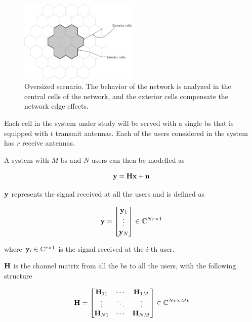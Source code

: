 \begin{figure}[t]
   \centering
   \includegraphics[width=0.5\textwidth]{./03.system_model/img/interfering_scenario}
   \caption{Oversized scenario. The behavior of the network is analyzed in the
            central cells of the network, and the exterior cells compensate the 
            network edge effects.}
   \label{fig:interfering_scenario}
\end{figure}

Each cell in the system under study will be served with a single \gls{bs} that
is equipped with $t$ transmit antennas. Each of the users considered in the
system has $r$ receive antennas.

A system with $M$ \gls{bs} and $N$ users can then be modelled as

\begin{equation} \label{eq:generic_system_model}
    \mathbf{y} = \mathbf{H} \mathbf{x} + \mathbf{n}
\end{equation}

$\mathbf{y}$ represents the signal received at all the users and is defined as

\begin{equation} \label{eq:generic_rx_signal}
    \mathbf{y} = \begin{bmatrix}
            \mathbf{y}_1\\
            \vdots\\
            \mathbf{y}_N
        \end{bmatrix} \in \mathbb{C}^{Nr \times 1}
\end{equation}

\noindent
where $\mathbf{y}_i \in \mathbb{C}^{r \times 1}$ is the signal received at the $i$-th user.

$\mathbf{H}$ is the channel matrix from all the \gls{bs} to all the users, with the
following structure

\begin{equation} \label{eq:generic_ch_mat}
    \mathbf{H} = \begin{bmatrix}
            \mathbf{H}_{11} & \cdots & \mathbf{H}_{1M}\\
            \vdots   & \ddots & \vdots\\
            \mathbf{H}_{N1}  & \cdots & \mathbf{H}_{NM}
    \end{bmatrix} \in \mathbb{C}^{Nr \times Mt}
\end{equation}

